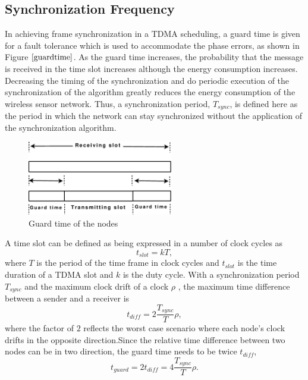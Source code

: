 \documentclass[journal]{IEEEtran}
\begin{document}
\subsection{\textbf{Synchronization Frequency}}\noindent
In achieving frame synchronization in a TDMA scheduling, a guard
time is given for a fault tolerance which is used to accommodate the
phase errors, as shown in Figure $\ref{guardtime}$.  As the guard time increases,
the probability that the message is received in the time slot
increases although the energy consumption increases.
\newline Decreasing the timing of the synchronization and do periodic
execution of the synchronization of the algorithm greatly reduces
the energy consumption of the wireless
sensor network. Thus, a synchronization period, $T_{sync}$, is
defined here as the period in which the network can stay
synchronized without the application of the synchronization
algorithm.
\begin{figure}
\centering
\includegraphics[width=2.5in]{guardtime}
\caption{Guard time of the nodes} \label{guardtime}
\end{figure}
\newline A time slot can be defined as being expressed in a
number of clock cycles as
\begin{equation}
t_{slot} = kT ,
\end{equation} where $T$ is the period of the time frame in clock cycles and
$t_{slot}$ is the time duration of a TDMA slot and $k$ is the duty
cycle.
\newline With a synchronization period $T_{sync}$ and the
maximum clock drift of a clock $\rho$ , the maximum time difference
between a sender and a receiver is
\begin{equation}
t_{diff} = 2\frac{T_{sync}}{T}\rho ,
\end{equation}
where the factor of $2$ reflects the worst case scenario where each
node's clock drifts in the opposite direction.\newline Since the
relative time difference between two nodes can be in two direction,
the guard time needs to be twice $t_{diff}$,
\begin{equation}
t_{guard}= 2t_{diff} = 4\frac{T_{sync}}{T}\rho.
\end{equation}
\end{document}
